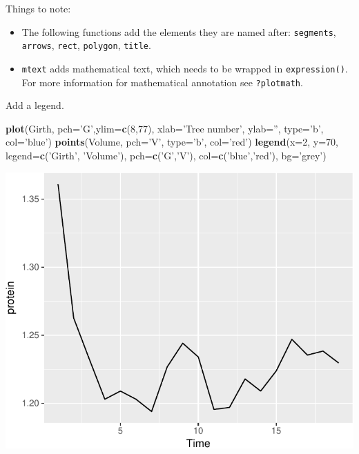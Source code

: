 \documentclass[]{book}
\newenvironment{Shaded}{\begin{snugshade}}{\end{snugshade}}
\newcommand{\DataTypeTok}[1]{\textcolor[rgb]{0.13,0.29,0.53}{#1}}
\newcommand{\DecValTok}[1]{\textcolor[rgb]{0.00,0.00,0.81}{#1}}
\newcommand{\KeywordTok}[1]{\textcolor[rgb]{0.13,0.29,0.53}{\textbf{#1}}}
\newcommand{\NormalTok}[1]{#1}
\newcommand{\StringTok}[1]{\textcolor[rgb]{0.31,0.60,0.02}{#1}}
\providecommand{\tightlist}{%
  \setlength{\itemsep}{0pt}\setlength{\parskip}{0pt}}
\theoremstyle{definition}
\theoremstyle{definition}
\theoremstyle{definition}
\theoremstyle{remark}
\begin{document}
Things to note:

\begin{itemize}
\tightlist
\item
  The following functions add the elements they are named after: \texttt{segments}, \texttt{arrows}, \texttt{rect}, \texttt{polygon}, \texttt{title}.
\item
  \texttt{mtext} adds mathematical text, which needs to be wrapped in \texttt{expression()}. For more information for mathematical annotation see \texttt{?plotmath}.
\end{itemize}

Add a legend.

\begin{Shaded}
\begin{Highlighting}[]
\KeywordTok{plot}\NormalTok{(Girth, }\DataTypeTok{pch=}\StringTok{'G'}\NormalTok{,}\DataTypeTok{ylim=}\KeywordTok{c}\NormalTok{(}\DecValTok{8}\NormalTok{,}\DecValTok{77}\NormalTok{), }\DataTypeTok{xlab=}\StringTok{'Tree number'}\NormalTok{, }\DataTypeTok{ylab=}\StringTok{''}\NormalTok{, }\DataTypeTok{type=}\StringTok{'b'}\NormalTok{, }\DataTypeTok{col=}\StringTok{'blue'}\NormalTok{)}
\KeywordTok{points}\NormalTok{(Volume, }\DataTypeTok{pch=}\StringTok{'V'}\NormalTok{, }\DataTypeTok{type=}\StringTok{'b'}\NormalTok{, }\DataTypeTok{col=}\StringTok{'red'}\NormalTok{)}
\KeywordTok{legend}\NormalTok{(}\DataTypeTok{x=}\DecValTok{2}\NormalTok{, }\DataTypeTok{y=}\DecValTok{70}\NormalTok{, }\DataTypeTok{legend=}\KeywordTok{c}\NormalTok{(}\StringTok{'Girth'}\NormalTok{, }\StringTok{'Volume'}\NormalTok{), }\DataTypeTok{pch=}\KeywordTok{c}\NormalTok{(}\StringTok{'G'}\NormalTok{,}\StringTok{'V'}\NormalTok{), }\DataTypeTok{col=}\KeywordTok{c}\NormalTok{(}\StringTok{'blue'}\NormalTok{,}\StringTok{'red'}\NormalTok{), }\DataTypeTok{bg=}\StringTok{'grey'}\NormalTok{)}
\end{Highlighting}
\end{Shaded}

\includegraphics[width=0.5\linewidth]{Rcourse_files/figure-latex/unnamed-chunk-253-1}
\end{document}
